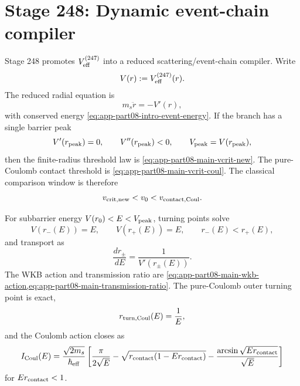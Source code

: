 \section{Stage 248: Dynamic event-chain compiler}
\label{sec:app-part08:dynamic-event-chain-compiler}
\label{stage:248}


Stage 248 promotes \(V_{\rm eff}^{(247)}\) into a reduced scattering/event-chain compiler.  Write
\begin{equation}
\label{eq:app-part08-stage248-vdef}
V(r):=V_{\rm eff}^{(247)}(r).
\end{equation}
The reduced radial equation is
\begin{equation}
\label{eq:app-part08-stage248-radial-eom}
m_s\ddot r=-V'(r),
\end{equation}
with conserved energy \cref{eq:app-part08-intro-event-energy}.  If the branch has a single barrier peak
\begin{equation}
\label{eq:app-part08-stage248-peak}
V'(r_{\rm peak})=0,
\qquad
V''(r_{\rm peak})<0,
\qquad
V_{\rm peak}=V(r_{\rm peak}),
\end{equation}
then the finite-radius threshold law is \cref{eq:app-part08-main-vcrit-new}.  The pure-Coulomb contact threshold is \cref{eq:app-part08-main-vcrit-coul}.  The classical comparison window is therefore
\begin{equation}
\label{eq:app-part08-stage248-classical-window}
v_{\rm crit,new}<v_0<v_{\rm contact,Coul}.
\end{equation}

For subbarrier energy \(V(r_0)<E<V_{\rm peak}\), turning points solve
\begin{equation}
\label{eq:app-part08-stage248-turning-points}
V(r_-(E))=E,
\qquad
V(r_+(E))=E,
\qquad
r_-(E)<r_+(E),
\end{equation}
and transport as
\begin{equation}
\label{eq:app-part08-stage248-turning-transport}
\frac{dr_\pm}{dE}=\frac1{V'(r_\pm(E))}.
\end{equation}
The WKB action and transmission ratio are \cref{eq:app-part08-main-wkb-action,eq:app-part08-main-transmission-ratio}.  The pure-Coulomb outer turning point is exact,
\begin{equation}
\label{eq:app-part08-stage248-coul-turn}
r_{\rm turn,Coul}(E)=\frac1E,
\end{equation}
and the Coulomb action closes as
\begin{equation}
\label{eq:app-part08-stage248-coul-action}
I_{\rm Coul}(E)
=
\frac{\sqrt{2m_s}}{\hbar_{\rm eff}}
\left[
\frac{\pi}{2\sqrt E}
-
\sqrt{r_{\rm contact}(1-Er_{\rm contact})}
-
\frac{\arcsin\sqrt{Er_{\rm contact}}}{\sqrt E}
\right]
\end{equation}
for \(Er_{\rm contact}<1\).


